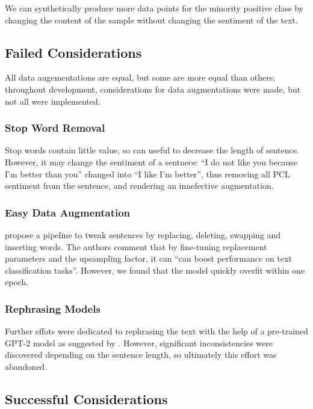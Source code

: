 \documentclass[11pt,a4paper]{article}
\begin{document}
We can synthetically produce more data points for the minority positive class by changing the content of the sample without changing the sentiment of the text. 

\subsection{Failed Considerations}

All data augementations are equal, but some are more equal than others; throughout development, considerations for data augmentations were made, but not all were implemented.

\subsubsection{Stop Word Removal}

Stop words contain little value, so can useful to decrease the length of sentence. However, it may change the sentiment of a sentnece: ``I do not like you because I'm better than you'' changed into ``I like I'm better'', thus removing all PCL sentiment from the sentence, and rendering an innefective augmentation.

\subsubsection{Easy Data Augmentation}

\citet{wei-zou-2019-eda} propose a pipeline to tweak sentences by replacing, deleting, swapping and inserting words. The authors comment that by fine-tuning replacement parameters and the upsampling factor, it can ``can boost performance on text classification tasks''. However, we found that the model quickly overfit within one epoch.

\subsubsection{Rephrasing Models}

Further effots were dedicated to rephrasing the text with the help of a pre-trained GPT-2 model as suggested by \citet{Dai2023AugGPTLC}. However, significant inconsistencies were discovered depending on the sentence length, so ultimately this effort was abandoned.

\subsection{Successful Considerations}
\end{document}
